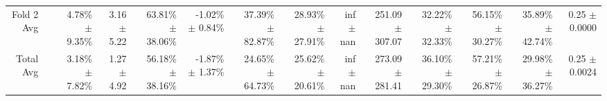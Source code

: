 \begin{table}[H]
{\begin{tabular}{rrrrrrrrrrrrrr}
Fold 2 Avg &  & \shortstack{4.78\% \\ $\pm$ 9.35\%} & \shortstack{3.16 \\ $\pm$ 5.22} & \shortstack{63.81\% \\ $\pm$ 38.06\%} & \shortstack{-1.02\% \\ $\pm$ 0.84\%} & \shortstack{37.39\% \\ $\pm$ 82.87\%} & \shortstack{28.93\% \\ $\pm$ 27.91\%} & \shortstack{inf \\ $\pm$ nan} & \shortstack{251.09 \\ $\pm$ 307.07} & \shortstack{32.22\% \\ $\pm$ 32.33\%} & \shortstack{56.15\% \\ $\pm$ 30.27\%} & \shortstack{35.89\% \\ $\pm$ 42.74\%} & \shortstack{0.25 \\ $\pm$ 0.0000} \\
Total Avg &  & \shortstack{3.18\% \\ $\pm$ 7.82\%} & \shortstack{1.27 \\ $\pm$ 4.92} & \shortstack{56.18\% \\ $\pm$ 38.16\%} & \shortstack{-1.87\% \\ $\pm$ 1.37\%} & \shortstack{24.65\% \\ $\pm$ 64.73\%} & \shortstack{25.62\% \\ $\pm$ 20.61\%} & \shortstack{inf \\ $\pm$ nan} & \shortstack{273.09 \\ $\pm$ 281.41} & \shortstack{36.10\% \\ $\pm$ 29.30\%} & \shortstack{57.21\% \\ $\pm$ 26.87\%} & \shortstack{29.98\% \\ $\pm$ 36.27\%} & \shortstack{0.25 \\ $\pm$ 0.0024} \\
\bottomrule
\end{tabular}}
\end{table}

